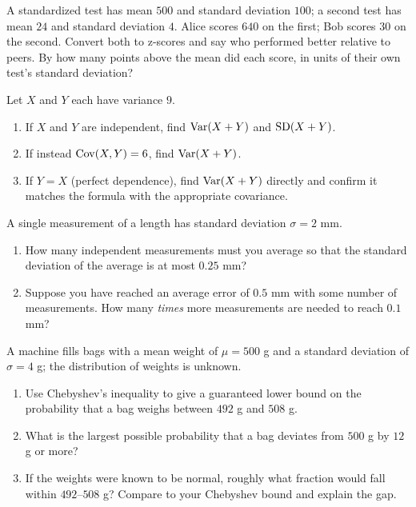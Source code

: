 \begin{exercise}
\label{ch09:exr-zscore}
A standardized test has mean $500$ and standard deviation $100$; a second test
has mean $24$ and standard deviation $4$. Alice scores $640$ on the first;
Bob scores $30$ on the second. Convert both to z-scores and say who performed
better relative to peers. By how many points above the mean did each score,
in units of their own test's standard deviation?
\end{exercise}

\begin{exercise}
\label{ch09:exr-sum}
Let $X$ and $Y$ each have variance $9$.
\begin{enumerate}
  \item If $X$ and $Y$ are independent, find $\operatorname{Var}(X+Y)$ and $\operatorname{SD}(X+Y)$.
  \item If instead $\operatorname{Cov}(X,Y) = 6$, find $\operatorname{Var}(X+Y)$.
  \item If $Y = X$ (perfect dependence), find $\operatorname{Var}(X+Y)$ directly and
        confirm it matches the formula with the appropriate covariance.
\end{enumerate}
\end{exercise}

\begin{exercise}
\label{ch09:exr-sqrtn}
A single measurement of a length has standard deviation $\sigma = 2$ mm.
\begin{enumerate}
  \item How many independent measurements must you average so that the
        standard deviation of the average is at most $0.25$ mm?
  \item Suppose you have reached an average error of $0.5$ mm with some number
        of measurements. How many \emph{times} more measurements are needed to
        reach $0.1$ mm?
\end{enumerate}
\end{exercise}

\begin{exercise}
\label{ch09:exr-cheby}
A machine fills bags with a mean weight of $\mu = 500$ g and a standard
deviation of $\sigma = 4$ g; the distribution of weights is unknown.
\begin{enumerate}
  \item Use Chebyshev's inequality to give a guaranteed lower bound on the
        probability that a bag weighs between $492$ g and $508$ g.
  \item What is the largest possible probability that a bag deviates from
        $500$ g by $12$ g or more?
  \item If the weights were known to be normal, roughly what fraction would
        fall within $492$--$508$ g? Compare to your Chebyshev bound and explain
        the gap.
\end{enumerate}
\end{exercise}

